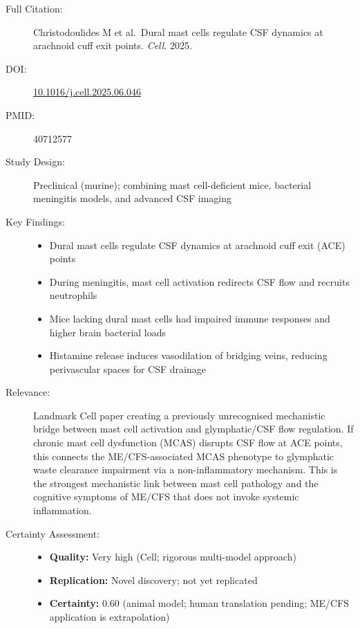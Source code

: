 \begin{description}
    \item[Full Citation:] Christodoulides M et al.\ Dural mast cells regulate CSF dynamics at arachnoid cuff exit points. \textit{Cell}. 2025.
    \item[DOI:] \href{https://doi.org/10.1016/j.cell.2025.06.046}{10.1016/j.cell.2025.06.046}
    \item[PMID:] 40712577
    \item[Study Design:] Preclinical (murine); combining mast cell-deficient mice, bacterial meningitis models, and advanced CSF imaging
    \item[Key Findings:]
    \begin{itemize}
        \item Dural mast cells regulate CSF dynamics at arachnoid cuff exit (ACE) points
        \item During meningitis, mast cell activation redirects CSF flow and recruits neutrophils
        \item Mice lacking dural mast cells had impaired immune responses and higher brain bacterial loads
        \item Histamine release induces vasodilation of bridging veins, reducing perivascular spaces for CSF drainage
    \end{itemize}
    \item[Relevance:] Landmark Cell paper creating a previously unrecognised mechanistic bridge between mast cell activation and glymphatic/CSF flow regulation. If chronic mast cell dysfunction (MCAS) disrupts CSF flow at ACE points, this connects the ME/CFS-associated MCAS phenotype to glymphatic waste clearance impairment via a non-inflammatory mechanism. This is the strongest mechanistic link between mast cell pathology and the cognitive symptoms of ME/CFS that does not invoke systemic inflammation.
    \item[Certainty Assessment:]
    \begin{itemize}
        \item \textbf{Quality:} Very high (Cell; rigorous multi-model approach)
        \item \textbf{Replication:} Novel discovery; not yet replicated
        \item \textbf{Certainty:} 0.60 (animal model; human translation pending; ME/CFS application is extrapolation)
    \end{itemize}
\end{description}

